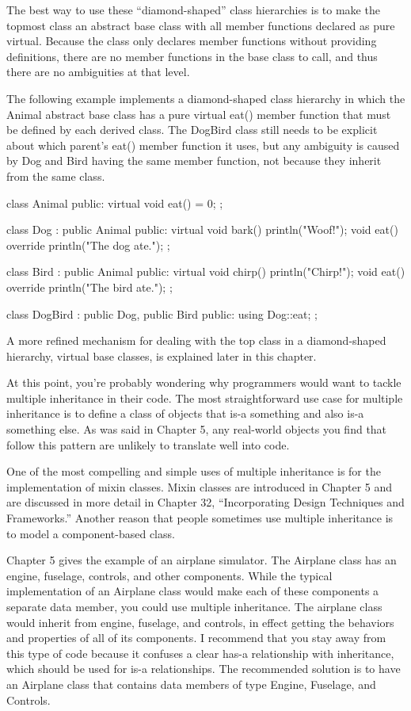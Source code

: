 The best way to use these “diamond-shaped” class hierarchies is to make the topmost class an abstract base class with all member functions declared as pure virtual. Because the class only declares member functions without providing definitions, there are no member functions in the base class to call, and thus there are no ambiguities at that level.

The following example implements a diamond-shaped class hierarchy in which the Animal abstract base class has a pure virtual eat() member function that must be defined by each derived class. The DogBird class still needs to be explicit about which parent’s eat() member function it uses, but any ambiguity is caused by Dog and Bird having the same member function, not because they inherit from the same class.

\begin{cpp}
class Animal
{
    public:
        virtual void eat() = 0;
};

class Dog : public Animal
{
    public:
        virtual void bark() { println("Woof!"); }
        void eat() override { println("The dog ate."); }
};

class Bird : public Animal
{
    public:
        virtual void chirp() { println("Chirp!"); }
        void eat() override { println("The bird ate."); }
};

class DogBird : public Dog, public Bird
{
    public:
        using Dog::eat;
};
\end{cpp}

A more refined mechanism for dealing with the top class in a diamond-shaped hierarchy, virtual base classes, is explained later in this chapter.


At this point, you’re probably wondering why programmers would want to tackle multiple inheritance in their code. The most straightforward use case for multiple inheritance is to define a class of objects that is-a something and also is-a something else. As was said in Chapter 5, any real-world objects you find that follow this pattern are unlikely to translate well into code.

One of the most compelling and simple uses of multiple inheritance is for the implementation of mixin classes. Mixin classes are introduced in Chapter 5 and are discussed in more detail in Chapter 32, “Incorporating Design Techniques and Frameworks.” Another reason that people sometimes use multiple inheritance is to model a component-based class.

Chapter 5 gives the example of an airplane simulator. The Airplane class has an engine, fuselage, controls, and other components. While the typical implementation of an Airplane class would make each of these components a separate data member, you could use multiple inheritance. The airplane class would inherit from engine, fuselage, and controls, in effect getting the behaviors and properties of all of its components. I recommend that you stay away from this type of code because it confuses a clear has-a relationship with inheritance, which should be used for is-a relationships. The recommended solution is to have an Airplane class that contains data members of type Engine, Fuselage, and Controls.

